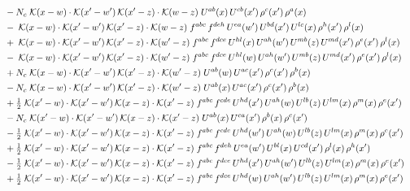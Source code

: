 \documentclass[9pt]{article}
\begin{document}
\begin{align}
&\quad -N_c\;\mathcal{K}(x-w)\cdot\mathcal{K}(x'-w')\,\mathcal{K}(x'-z)\cdot\mathcal{K}(w-z)\;U^{ab}(x)\,U^{cb}(x')\,\rho^{c}(x')\,\rho^{a}(x)\notag\\
&\quad -\;\mathcal{K}(x-w)\cdot\mathcal{K}(x'-w')\,\mathcal{K}(x'-z)\cdot\mathcal{K}(w-z)\;f^{abc}\,f^{deh}\,U^{ea}(w')\,U^{bd}(x')\,U^{lc}(x)\,\rho^{h}(x')\,\rho^{l}(x)\notag\\
&\quad +\;\mathcal{K}(x-w)\cdot\mathcal{K}(x'-w')\,\mathcal{K}(x'-z)\cdot\mathcal{K}(w'-z)\;f^{abc}\,f^{dce}\,U^{hl}(x)\,U^{ah}(w')\,U^{mb}(z)\,U^{md}(x')\,\rho^{e}(x')\,\rho^{l}(x)\notag\\
&\quad -\;\mathcal{K}(x-w)\cdot\mathcal{K}(x'-w')\,\mathcal{K}(x'-z)\cdot\mathcal{K}(w'-z)\;f^{abc}\,f^{dce}\,U^{hl}(w)\,U^{ah}(w')\,U^{mb}(z)\,U^{md}(x')\,\rho^{e}(x')\,\rho^{l}(x)\notag\\
&\quad +N_c\;\mathcal{K}(x-w)\cdot\mathcal{K}(x'-w')\,\mathcal{K}(x'-z)\cdot\mathcal{K}(w'-z)\;U^{ab}(w)\,U^{ac}(x')\,\rho^{c}(x')\,\rho^{b}(x)\notag\\
&\quad -N_c\;\mathcal{K}(x-w)\cdot\mathcal{K}(x'-w')\,\mathcal{K}(x'-z)\cdot\mathcal{K}(w'-z)\;U^{ab}(x)\,U^{ac}(x')\,\rho^{c}(x')\,\rho^{b}(x)\notag\\
&\quad +\tfrac{1}{2}\;\mathcal{K}(x'-w)\cdot\mathcal{K}(x'-w')\,\mathcal{K}(x-z)\cdot\mathcal{K}(x'-z)\;f^{abc}\,f^{cde}\,U^{hd}(x')\,U^{ah}(w)\,U^{lb}(z)\,U^{lm}(x)\,\rho^{m}(x)\,\rho^{e}(x')\notag\\
&\quad -N_c\;\mathcal{K}(x'-w)\cdot\mathcal{K}(x'-w')\,\mathcal{K}(x-z)\cdot\mathcal{K}(x'-z)\;U^{ab}(x)\,U^{ca}(x')\,\rho^{b}(x)\,\rho^{c}(x')\notag\\
&\quad -\tfrac{1}{2}\;\mathcal{K}(x'-w)\cdot\mathcal{K}(x'-w')\,\mathcal{K}(x-z)\cdot\mathcal{K}(x'-z)\;f^{abc}\,f^{cde}\,U^{hd}(w')\,U^{ah}(w)\,U^{lb}(z)\,U^{lm}(x)\,\rho^{m}(x)\,\rho^{e}(x')\notag\\
&\quad +\tfrac{1}{2}\;\mathcal{K}(x'-w)\cdot\mathcal{K}(x'-w')\,\mathcal{K}(x-z)\cdot\mathcal{K}(x'-z)\;f^{abc}\,f^{deh}\,U^{ea}(w')\,U^{bl}(x)\,U^{cd}(x')\,\rho^{l}(x)\,\rho^{h}(x')\notag\\
&\quad -\tfrac{1}{2}\;\mathcal{K}(x'-w)\cdot\mathcal{K}(x'-w')\,\mathcal{K}(x-z)\cdot\mathcal{K}(x'-z)\;f^{abc}\,f^{dce}\,U^{hd}(x')\,U^{ah}(w')\,U^{lb}(z)\,U^{lm}(x)\,\rho^{m}(x)\,\rho^{e}(x')\notag\\
&\quad +\tfrac{1}{2}\;\mathcal{K}(x'-w)\cdot\mathcal{K}(x'-w')\,\mathcal{K}(x-z)\cdot\mathcal{K}(x'-z)\;f^{abc}\,f^{dce}\,U^{hd}(w)\,U^{ah}(w')\,U^{lb}(z)\,U^{lm}(x)\,\rho^{m}(x)\,\rho^{e}(x')\notag\\

\end{align}
\end{document}
